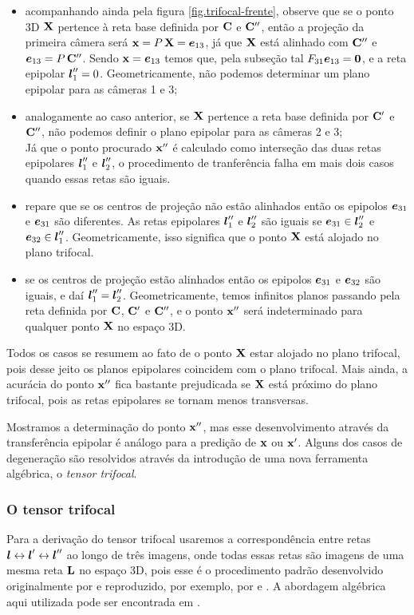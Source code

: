 \begin{itemize}
\item acompanhando ainda pela figura \ref{fig.trifocal-frente}, observe que se o ponto 3D $\mathbf{X}$ pertence à reta base definida por ${\bf C}$ e ${\bf C}''$, então a projeção da primeira câmera será $\mathbf{x}=P\,\mathbf{X}=\boldsymbol{e}_{13}$, já que $\mathbf{X}$ está alinhado com ${\bf C}''$ e $\boldsymbol{e}_{13}=P\,{\bf C}''$. Sendo $\mathbf{x}=\boldsymbol{e}_{13}$ temos que, pela subseção tal $F_{31}\boldsymbol{e}_{13}={\bf 0}$, e a reta epipolar $\boldsymbol{l}''_1=0$. Geometricamente, não podemos determinar um plano epipolar para as câmeras 1 e 3;
\item analogamente ao caso anterior, se $\mathbf{X}$ pertence a reta base definida por ${\bf C}'$ e ${\bf C}''$, não podemos definir o plano epipolar para as câmeras 2 e 3;\\

Já que o ponto procurado $\mathbf{x}''$ é calculado como interseção das duas retas epipolares $\boldsymbol{l}''_1$ e $\boldsymbol{l}''_2$, o procedimento de tranferência falha em mais dois casos quando essas retas são iguais.

\item repare que se os centros de projeção não estão alinhados então os epipolos $\boldsymbol{e}_{31}$ e $\boldsymbol{e}_{31}$ são diferentes. As retas epipolares $\boldsymbol{l}''_1$ e $\boldsymbol{l}''_2$ são iguais se $\boldsymbol{e}_{31}\in\boldsymbol{l}''_2$ e $\boldsymbol{e}_{32}\in\boldsymbol{l}''_1$. Geometricamente, isso significa que o ponto $\mathbf{X}$ está alojado no plano trifocal.

\item se os centros de projeção estão alinhados então os epipolos $\boldsymbol{e}_{31}$ e $\boldsymbol{e}_{32}$ são iguais, e daí $\boldsymbol{l}''_1=\boldsymbol{l}''_2$. Geometricamente, temos infinitos planos passando pela reta definida por ${\bf C}$, ${\bf C}'$ e ${\bf C}''$, e o ponto $\mathbf{x}''$ será indeterminado para qualquer ponto $\mathbf{X}$ no espaço 3D.
\end{itemize}

Todos os casos se resumem ao fato de o ponto $\mathbf{X}$ estar alojado no plano trifocal, pois desse jeito os planos epipolares coincidem com o plano trifocal. Mais ainda, a acurácia do ponto $\mathbf{x}''$ fica bastante prejudicada se $\mathbf{X}$ está próximo do plano trifocal, pois as retas epipolares se tornam menos transversas. 

Mostramos a determinação do ponto $\mathbf{x}''$, mas esse desenvolvimento através da transferência epipolar é análogo para a predição de $\mathbf{x}$ ou $\mathbf{x}'$. Alguns dos casos de degeneração são resolvidos através da introdução de uma nova ferramenta algébrica, o {\it tensor trifocal}.

\subsubsection{O tensor trifocal}
Para a derivação do tensor trifocal usaremos a correspondência entre retas $\boldsymbol{l}\leftrightarrow\boldsymbol{l}'\leftrightarrow\boldsymbol{l}''$ ao longo de três imagens, onde todas essas retas são imagens de uma mesma reta $\bf L$ no espaço 3D, pois esse é o procedimento padrão desenvolvido originalmente por 
\citep{original-trifocal-retas} e reproduzido, por exemplo, por  \citep{Faugeras} e \citep{forsyth}. A abordagem algébrica aqui utilizada pode ser encontrada em \citep{Hartley2004}.

